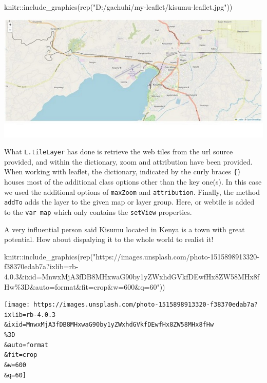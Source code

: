 \documentclass[
]{book}
\newenvironment{Shaded}{\begin{snugshade}}{\end{snugshade}}
\newcommand{\FunctionTok}[1]{\textcolor[rgb]{0.00,0.00,0.00}{#1}}
\newcommand{\NormalTok}[1]{#1}
\newcommand{\SpecialCharTok}[1]{\textcolor[rgb]{0.00,0.00,0.00}{#1}}
\newcommand{\StringTok}[1]{\textcolor[rgb]{0.31,0.60,0.02}{#1}}
\theoremstyle{definition}
\theoremstyle{definition}
\theoremstyle{definition}
\theoremstyle{definition}
\theoremstyle{remark}
\begin{document}
\begin{Shaded}
\begin{Highlighting}[]
\NormalTok{knitr}\SpecialCharTok{::}\FunctionTok{include\_graphics}\NormalTok{(}\FunctionTok{rep}\NormalTok{(}\StringTok{"D:/gachuhi/my{-}leaflet/kisumu{-}leaflet.jpg"}\NormalTok{))}
\end{Highlighting}
\end{Shaded}

\includegraphics[width=11.11in]{../kisumu-leaflet}

What \texttt{L.tileLayer} has done is retrieve the web tiles from the url source provided, and within the dictionary, zoom and attribution have been provided. When working with leaflet, the dictionary, indicated by the curly braces \texttt{\{\}} houses most of the additional class options other than the key one(s). In this case we used the additional options of \texttt{maxZoom} and \texttt{attribution}. Finally, the method \texttt{addTo} adds the layer to the given map or layer group. Here, or webtile is added to the \texttt{var\ map} which only contains the \texttt{setView} properties.

A very influential person said Kisumu located in Kenya is a town with great potential. How about dispalying it to the whole world to realist it!

\begin{Shaded}
\begin{Highlighting}[]
\NormalTok{knitr}\SpecialCharTok{::}\FunctionTok{include\_graphics}\NormalTok{(}\FunctionTok{rep}\NormalTok{(}\StringTok{"https://images.unsplash.com/photo{-}1515898913320{-}f38370edab7a?ixlib=rb{-}4.0.3\&ixid=MnwxMjA3fDB8MHxwaG90by1yZWxhdGVkfDEwfHx8ZW58MHx8fHw\%3D\&auto=format\&fit=crop\&w=600\&q=60"}\NormalTok{))}
\end{Highlighting}
\end{Shaded}

\texttt{[image: https://images.unsplash.com/photo-1515898913320-f38370edab7a?ixlib=rb-4.0.3\\\&ixid=MnwxMjA3fDB8MHxwaG90by1yZWxhdGVkfDEwfHx8ZW58MHx8fHw\\\%3D\\\&auto=format\\\&fit=crop\\\&w=600\\\&q=60]}
\end{document}
